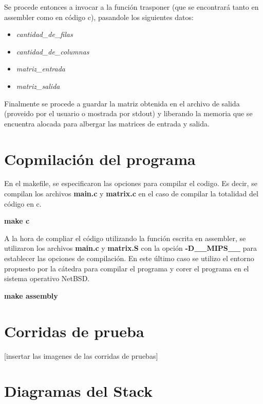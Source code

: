 \documentclass[11pt,a4paper]{article}
\begin{document}
Se procede entonces a invocar a la funci\'on trasponer (que se encontrar\'a tanto en assembler como en c\'odigo c), pasandole los siguientes datos:\\

\begin{itemize}
\item \textit{cantidad\_de\_filas}
\item \textit{cantidad\_de\_columnas}
\item \textit{matriz\_entrada}
\item \textit{matriz\_salida}
\end{itemize}

Finalmente se procede a guardar la matriz obtenida en el archivo de salida (proveido por el usuario o mostrada por stdout) y liberando la memoria que se encuentra alocada para albergar las matrices de entrada y salida.


\section{Copmilaci\'on del programa}

En el makefile, se especificaron las opciones para compilar el codigo. Es decir, se compilan los archivos \textbf{main.c} y \textbf{matrix.c} en el caso de compilar la totalidad del c\'odigo en c. 

\begin{center}
\textbf{make c}
\end{center}

A la hora de compliar el c\'odigo utilizando la funci\'on escrita en assembler, se utilizaron los archivos \textbf{main.c} y \textbf{matrix.S} con la opci\'on \textbf{-D\_\_MIPS\_\_} para establecer las opciones de compilaci\'on. En este \'ultimo caso se utilizo el entorno propuesto por la c\'atedra para compilar el programa y corer el programa en el sistema operativo NetBSD.\\

\begin{center}
\textbf{make assembly}
\end{center}

\section{Corridas de prueba}

[insertar las imagenes de las corridas de pruebas]

\section{Diagramas del Stack}
\end{document}
